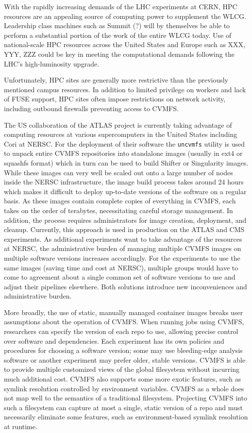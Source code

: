 \documentclass[conference]{IEEEtran}
\begin{document}
With the rapidly increasing demands of the LHC experiments at CERN,
HPC resources are an appealing source of computing power to supplement the WLCG.
Leadership class machines such as Summit (?) will by themselves be able to perform a substantial portion of the work of the entire WLCG today.
Use of national-scale HPC resources across the United States and Europe such as XXX, YYY, ZZZ could be key in meeting the computational demands following the LHC's high-luminosity upgrade.

Unfortunately, HPC sites are generally more restrictive than the previously mentioned campus resources.
In addition to limited privilege on workers and lack of FUSE support,
HPC sites often impose restrictions on network activity,
including outbound firewalls preventing access to CVMFS.

The US collaboration of the ATLAS project is currently taking advantage of computing resources at various supercomputers in the United States including Cori at NERSC.
For the deployment of their software the \texttt{uncvmfs} utility is used to unpack entire CVMFS repositories into standalone images (usually in ext4 or squashfs format) which in turn can be used to build Shifter or Singularity images.
While these images can very well be scaled out onto a large number of nodes inside the NERSC infrastructure,
the image build process takes around 24 hours which makes it difficult to deploy up-to-date versions of the software on a regular basis.
As these images contain complete copies of everything in CVMFS,
each takes on the order of terabytes,
necessitating careful storage management.
In addition, the process requires administrators for image creation, deployment, and cleanup.
Currently, this approach is used in production on the ATLAS and CMS experiments.
As additional experiments want to take advantage of the resources at NERSC,
the administrative burden of managing multiple CVMFS images on multiple software versions increases accordingly.
For the experiments to use the same images (saving time and cost at NERSC),
multiple groups would have to come to agreement about a single common set of software versions to use and adjust their pipelines elsewhere.
Both solutions introduce new inconveniences and administrative burden.

More broadly, the use of static, manually managed container images breaks user assumptions about the operation of CVMFS.
When running jobs using CVMFS,
researchers can specify the version of each repo to use,
allowing precise control over software and dependencies.
Each experiment has its own policies and procedures for choosing a software version;
some may use bleeding-edge analysis software or another experiment may prefer older, stable versions.
CVMFS is able to provide multiple customized views of the global filesystem without incurring much additional cost.
CVMFS also supports some more exotic features,
such as symlink resolution controlled by environment variables.
CVMFS as a whole does not map well to the semantics of a traditional filesystem.
Projecting CVMFS into such a filesystem can capture at most a single, static version of a repo and must necessarily eliminate some features,
such as environment-based symlink resolution at runtime.
\end{document}
